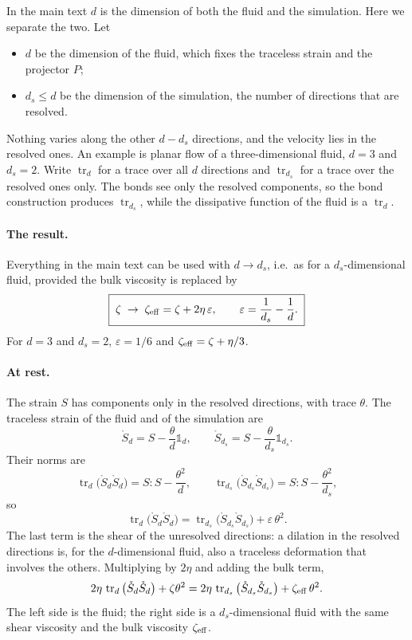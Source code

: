 \documentclass[11pt,aps,preprint,nofootinbib,superscriptaddress,tightenlines]{revtex4-2}
\def\st{\begin{equation}}
\def\stp{\end{equation}}
\providecommand{\tr}{\operatorname{tr}}
\newcommand{\one}{\mathds{1}}
\let\oldparagraph\paragraph
\renewcommand{\paragraph}{\par\bigskip\oldparagraph}
\begin{document}
In the main text $d$ is the dimension of both the fluid and the simulation.
Here we separate the two.  Let
\begin{itemize}
\item $d$ be the dimension of the fluid, which fixes the traceless strain and
  the projector $P$;
\item $d_s\le d$ be the dimension of the simulation, the number of directions
  that are resolved.
\end{itemize}
Nothing varies along the other $d-d_s$ directions, and the velocity lies in
the resolved ones.  An example is planar flow of a three-dimensional fluid,
$d=3$ and $d_s=2$.  Write $\tr_d$ for a trace over all $d$ directions and
$\tr_{d_s}$ for a trace over the resolved ones only.  The bonds see only the
resolved components, so the bond construction produces $\tr_{d_s}$, while the
dissipative function of the fluid is a $\tr_d$.

\paragraph{The result.}  Everything in the main text can be used with
$d\to d_s$, i.e.\ as for a $d_s$-dimensional fluid, provided the bulk viscosity
is replaced by
\st
\boxed{\;\zeta\;\to\;\zeta_{\rm eff}=\zeta+2\eta\,\varepsilon,\qquad
\varepsilon=\frac1{d_s}-\frac1d .\;}
\label{zetaeff}
\stp
For $d=3$ and $d_s=2$, $\varepsilon=1/6$ and $\zeta_{\rm eff}=\zeta+\eta/3$.

\paragraph{At rest.}  The strain $S$ has components only in the resolved
directions, with trace $\theta$.  The traceless strain of the fluid and of the
simulation are
\st
\mathring S_d=S-\frac{\theta}{d}\one_d,\qquad
\mathring S_{d_s}=S-\frac{\theta}{d_s}\one_{d_s} .
\stp
Their norms are
\st
\tr_d\big(\mathring S_d\mathring S_d\big)=S{:}S-\frac{\theta^2}{d},\qquad
\tr_{d_s}\big(\mathring S_{d_s}\mathring S_{d_s}\big)=S{:}S-\frac{\theta^2}{d_s},
\stp
so
\st
\tr_d\big(\mathring S_d\mathring S_d\big)
=\tr_{d_s}\big(\mathring S_{d_s}\mathring S_{d_s}\big)+\varepsilon\,\theta^2 .
\label{trsplit}
\stp
The last term is the shear of the unresolved directions: a dilation in the
resolved directions is, for the $d$-dimensional fluid, also a traceless
deformation that involves the others.  Multiplying by $2\eta$ and adding the
bulk term,
\st
2\eta\,\tr_d\big(\mathring S_d\mathring S_d\big)+\zeta\theta^2
=2\eta\,\tr_{d_s}\big(\mathring S_{d_s}\mathring S_{d_s}\big)+\zeta_{\rm eff}\,\theta^2 .
\stp
The left side is the fluid; the right side is a $d_s$-dimensional fluid with
the same shear viscosity and the bulk viscosity $\zeta_{\rm eff}$.
\end{document}
